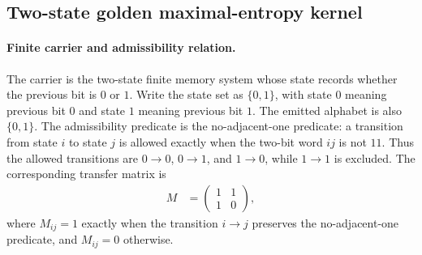 
\subsection{Two-state golden maximal-entropy kernel}
\label{sec:window6-parry-measure-golden-maximal-entropy}

\paragraph{Finite carrier and admissibility relation.}
The carrier is the two-state finite memory system whose state records whether the previous bit is $0$ or $1$.  Write the state set as $\{0,1\}$, with state $0$ meaning previous bit $0$ and state $1$ meaning previous bit $1$.  The emitted alphabet is also $\{0,1\}$.  The admissibility predicate is the no-adjacent-one predicate: a transition from state $i$ to state $j$ is allowed exactly when the two-bit word $ij$ is not $11$.  Thus the allowed transitions are $0\to 0$, $0\to 1$, and $1\to 0$, while $1\to 1$ is excluded.  The corresponding transfer matrix is
$$
\begin{aligned}
M&=\begin{pmatrix}1&1\\1&0\end{pmatrix},
\end{aligned}
$$
where $M_{ij}=1$ exactly when the transition $i\to j$ preserves the no-adjacent-one predicate, and $M_{ij}=0$ otherwise.

